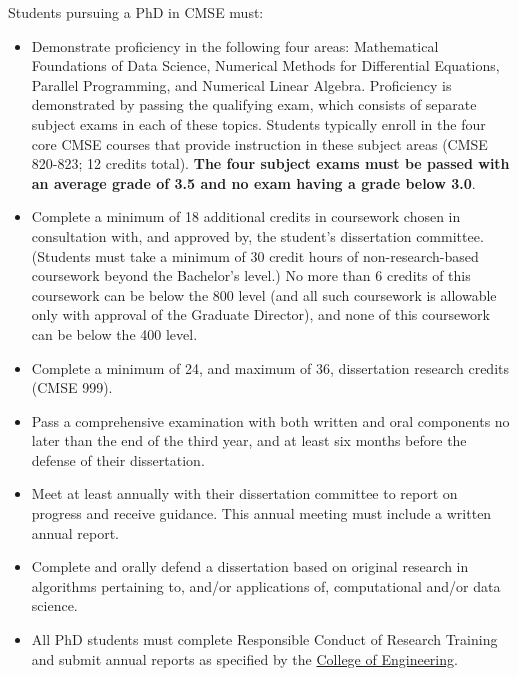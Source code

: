 Students pursuing a PhD in CMSE must:

\begin{itemize}
\item  Demonstrate proficiency in the following four areas:
  Mathematical Foundations of Data Science, Numerical Methods for
  Differential Equations, Parallel Programming, and Numerical Linear
  Algebra.  Proficiency is demonstrated by passing the qualifying
  exam, which consists of separate subject exams in each of these
  topics.  Students typically enroll in the four core CMSE courses
  that provide instruction in these subject areas (CMSE 820-823; 12
  credits total).  \textbf{The four subject exams must be passed with an
  average grade of 3.5 and no exam having a grade below 3.0}.

\item Complete a minimum of 18 additional credits in coursework
  chosen in consultation with, and approved by, the student’s
  dissertation committee.  (Students must take a minimum of 30 credit
  hours of non-research-based coursework beyond the Bachelor's level.)
  No more than 6 credits of this coursework can be below the 800 level
  (and all such coursework is allowable only with approval of the
  Graduate Director), and none of this coursework can be below the 400
  level.

\item Complete a minimum of 24, and maximum of 36, dissertation
  research credits (CMSE 999).

\item Pass a comprehensive examination with both written and oral
  components no later than the end of the third year, and at least six months before the defense of their
  dissertation.

\item Meet at least annually with their dissertation committee to report on
  progress and receive guidance.  This annual meeting must include a
  written annual report.

\item Complete and orally defend a dissertation based on original
  research in algorithms pertaining to, and/or applications of,
  computational and/or data science.  

\item All PhD students must complete Responsible Conduct of Research
  Training and submit annual reports as specified by the
  \href{https://www.egr.msu.edu/academics/graduate/rcr}{College of
    Engineering}.

\end{itemize}

